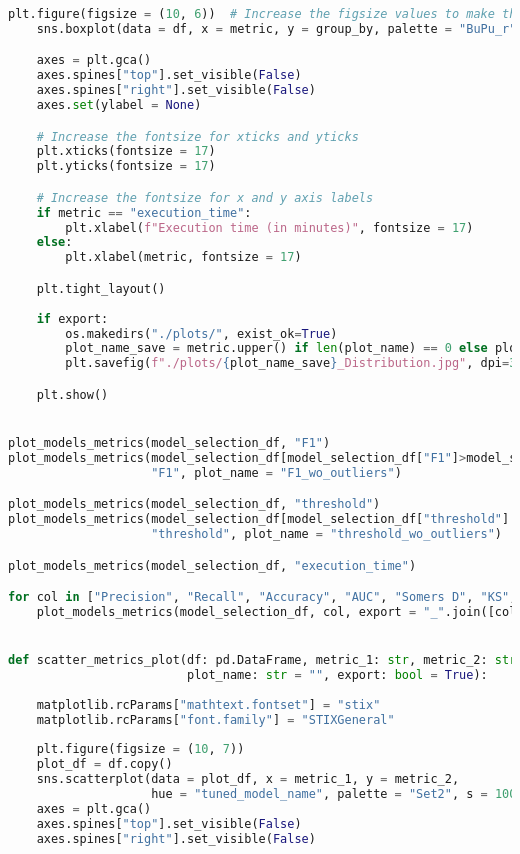 \begin{lstlisting}[language=Python, basicstyle=\footnotesize\ttfamily]
    plt.figure(figsize = (10, 6))  # Increase the figsize values to make the plot bigger
    sns.boxplot(data = df, x = metric, y = group_by, palette = "BuPu_r")

    axes = plt.gca()
    axes.spines["top"].set_visible(False)
    axes.spines["right"].set_visible(False)
    axes.set(ylabel = None)

    # Increase the fontsize for xticks and yticks
    plt.xticks(fontsize = 17)
    plt.yticks(fontsize = 17)

    # Increase the fontsize for x and y axis labels
    if metric == "execution_time":
        plt.xlabel(f"Execution time (in minutes)", fontsize = 17)
    else:
        plt.xlabel(metric, fontsize = 17)

    plt.tight_layout()
    
    if export:
        os.makedirs("./plots/", exist_ok=True)
        plot_name_save = metric.upper() if len(plot_name) == 0 else plot_name.upper()
        plt.savefig(f"./plots/{plot_name_save}_Distribution.jpg", dpi=300)

    plt.show()


plot_models_metrics(model_selection_df, "F1")
plot_models_metrics(model_selection_df[model_selection_df["F1"]>model_selection_df["F1"].min()],
                    "F1", plot_name = "F1_wo_outliers")

plot_models_metrics(model_selection_df, "threshold")
plot_models_metrics(model_selection_df[model_selection_df["threshold"] < model_selection_df["threshold"].max()],
                    "threshold", plot_name = "threshold_wo_outliers")

plot_models_metrics(model_selection_df, "execution_time")

for col in ["Precision", "Recall", "Accuracy", "AUC", "Somers D", "KS", "MCC", "Brier Score Loss", "Log Loss"]:
    plot_models_metrics(model_selection_df, col, export = "_".join([col]))


def scatter_metrics_plot(df: pd.DataFrame, metric_1: str, metric_2: str,
                         plot_name: str = "", export: bool = True):
    
    matplotlib.rcParams["mathtext.fontset"] = "stix"
    matplotlib.rcParams["font.family"] = "STIXGeneral"
    
    plt.figure(figsize = (10, 7))
    plot_df = df.copy()
    sns.scatterplot(data = plot_df, x = metric_1, y = metric_2,
                    hue = "tuned_model_name", palette = "Set2", s = 100, alpha = 0.7)
    axes = plt.gca()
    axes.spines["top"].set_visible(False)
    axes.spines["right"].set_visible(False)


\end{lstlisting}
